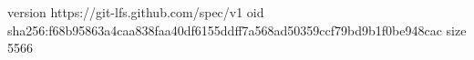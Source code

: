 version https://git-lfs.github.com/spec/v1
oid sha256:f68b95863a4caa838faa40df6155ddff7a568ad50359ccf79bd9b1f0be948cac
size 5566
